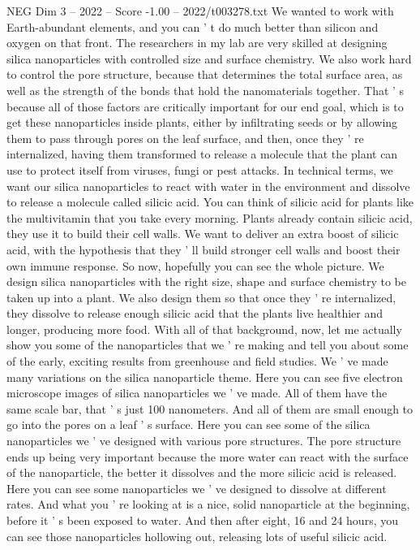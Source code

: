 \begin{textsample}{NEG Dim 3 – 2022 – Score -1.00 – 2022/t003278.txt}
We wanted to work with Earth-abundant elements, and you can ' t do much better than silicon and oxygen on that front.
The researchers in my lab are very skilled at designing silica nanoparticles with controlled size and surface chemistry.
We also work hard to control the pore structure, because that determines the total surface area, as well as the strength of the bonds that hold the nanomaterials together.
That ' s because all of those factors are critically important for our end goal, which is to get these nanoparticles inside plants, either by infiltrating seeds or by allowing them to pass through pores on the leaf surface, and then, once they ' re internalized, having them transformed to release a molecule that the plant can use to protect itself from viruses, fungi or pest attacks.
In technical terms, we want our silica nanoparticles to react with water in the environment and dissolve to release a molecule called silicic acid.
You can think of silicic acid for plants like the multivitamin that you take every morning.
Plants already contain silicic acid, they use it to build their cell walls.
We want to deliver an extra boost of silicic acid, with the hypothesis that they ' ll build stronger cell walls and boost their own immune response.
So now, hopefully you can see the whole picture.
We design silica nanoparticles with the right size, shape and surface chemistry to be taken up into a plant.
We also design them so that once they ' re internalized, they dissolve to release enough silicic acid that the plants live healthier and longer, producing more food.
With all of that background, now, let me actually show you some of the nanoparticles that we ' re making and tell you about some of the early, exciting results from greenhouse and field studies.
We ' ve made many variations on the silica nanoparticle theme.
Here you can see five electron microscope images of silica nanoparticles we ' ve made.
All of them have the same scale bar, that ' s just 100 nanometers.
And all of them are small enough to go into the pores on a leaf ' s surface.
Here you can see some of the silica nanoparticles we ' ve designed with various pore structures.
The pore structure ends up being very important because the more water can react with the surface of the nanoparticle, the better it dissolves and the more silicic acid is released.
Here you can see some nanoparticles we ' ve designed to dissolve at different rates.
And what you ' re looking at is a nice, solid nanoparticle at the beginning, before it ' s been exposed to water.
And then after eight, 16 and 24 hours, you can see those nanoparticles hollowing out, releasing lots of useful silicic acid.

\end{textsample}
